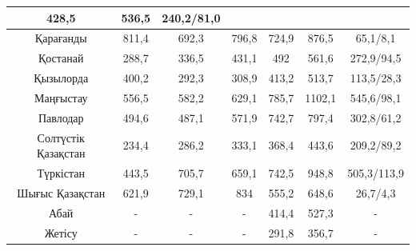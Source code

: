 \begin{table}[H]
{\begin{tabular}{|ccccccc|}
  \multicolumn{1}{c|}{428,5} &
  \multicolumn{1}{c|}{536,5} &
  240,2/81,0 \\ \hline
\multicolumn{1}{|c|}{Қарағанды} &
  \multicolumn{1}{c|}{811,4} &
  \multicolumn{1}{c|}{692,3} &
  \multicolumn{1}{c|}{796,8} &
  \multicolumn{1}{c|}{724,9} &
  \multicolumn{1}{c|}{876,5} &
  65,1/8,1 \\ \hline
\multicolumn{1}{|c|}{Қостанай} &
  \multicolumn{1}{c|}{288,7} &
  \multicolumn{1}{c|}{336,5} &
  \multicolumn{1}{c|}{431,1} &
  \multicolumn{1}{c|}{492} &
  \multicolumn{1}{c|}{561,6} &
  272,9/94,5 \\ \hline
\multicolumn{1}{|c|}{Қызылорда} &
  \multicolumn{1}{c|}{400,2} &
  \multicolumn{1}{c|}{292,3} &
  \multicolumn{1}{c|}{308,9} &
  \multicolumn{1}{c|}{413,2} &
  \multicolumn{1}{c|}{513,7} &
  113,5/28,3 \\ \hline
\multicolumn{1}{|c|}{Маңғыстау} &
  \multicolumn{1}{c|}{556,5} &
  \multicolumn{1}{c|}{582,2} &
  \multicolumn{1}{c|}{629,1} &
  \multicolumn{1}{c|}{785,7} &
  \multicolumn{1}{c|}{1102,1} &
  545,6/98,1 \\ \hline
\multicolumn{1}{|c|}{Павлодар} &
  \multicolumn{1}{c|}{494,6} &
  \multicolumn{1}{c|}{487,1} &
  \multicolumn{1}{c|}{571,9} &
  \multicolumn{1}{c|}{742,7} &
  \multicolumn{1}{c|}{797,4} &
  302,8/61,2 \\ \hline
\multicolumn{1}{|c|}{Солтүстік Қазақстан} &
  \multicolumn{1}{c|}{234,4} &
  \multicolumn{1}{c|}{286,2} &
  \multicolumn{1}{c|}{333,1} &
  \multicolumn{1}{c|}{368,4} &
  \multicolumn{1}{c|}{443,6} &
  209,2/89,2 \\ \hline
\multicolumn{1}{|c|}{Түркістан} &
  \multicolumn{1}{c|}{443,5} &
  \multicolumn{1}{c|}{705,7} &
  \multicolumn{1}{c|}{659,1} &
  \multicolumn{1}{c|}{742,5} &
  \multicolumn{1}{c|}{948,8} &
  505,3/113,9 \\ \hline
\multicolumn{1}{|c|}{Шығыс Қазақстан} &
  \multicolumn{1}{c|}{621,9} &
  \multicolumn{1}{c|}{729,1} &
  \multicolumn{1}{c|}{834} &
  \multicolumn{1}{c|}{555,2} &
  \multicolumn{1}{c|}{648,6} &
  26,7/4,3 \\ \hline
\multicolumn{1}{|c|}{Абай} &
  \multicolumn{1}{c|}{-} &
  \multicolumn{1}{c|}{-} &
  \multicolumn{1}{c|}{-} &
  \multicolumn{1}{c|}{414,4} &
  \multicolumn{1}{c|}{527,3} &
  - \\ \hline
\multicolumn{1}{|c|}{Жетісу} &
  \multicolumn{1}{c|}{-} &
  \multicolumn{1}{c|}{-} &
  \multicolumn{1}{c|}{-} &
  \multicolumn{1}{c|}{291,8} &
  \multicolumn{1}{c|}{356,7} &
  - \\ \hline

\end{tabular}}
\end{table}
